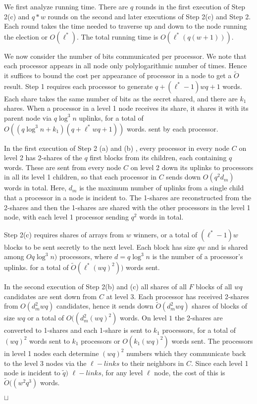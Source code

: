\documentclass[letterpaper,11pt]{article}
\newcommand{\sq}{\hbox{\rlap{$\sqcap$}$\sqcup$}}
\newcommand{\qed}{\hspace*{\fill}\sq}
\newenvironment{proof}{\noindent {\bf Proof:}}{\qed\par\vskip 4mm\par}
\begin{document}
\begin{proof}
We first analyze running time. There are  $q$ rounds in the first execution of  Step 2(c)  and $q*w$ rounds on the second and later executions of
Step 2(c) and Step 2.  Each round takes the time needed to traverse up and down to the node running the election or $O(\ell^*)$. 
The total running time is $O(\ell^*(q(w+1) ))$.

We now consider the number of bits communicated per processor. We note that each processor appears in all node only polylogarithmic number of times. Hence it suffices to bound the cost per appearance of processor in a node to get  a $\tilde{O}$ result. 
Step 1 requires each processor to  generate  $q + (\ell^*-1)wq +1$ words. Each share takes the same number of bits as the secret shared,  and there are
$k_1$ shares. When a processor in a level 1 node receives its share,  it  shares it with its parent node via $q \log^3 n$ uplinks, for a total of ${O}((q  \log^3 n + k_1)(q + \ell^*wq + 1))$ words.  sent by each processor. 

In the first execution of Step 2 (a) and (b) , every processor in every node $C$ on level 2 has  2-shares of the $q$ first blocks from its children, each containing $q$ words. These are  sent from every node $C$ on level 2 down its uplinks
to processors in all its  level 1 children,  so that each processor in  $C$ sends down $ {O}(q^2 d_m)$ words in total. Here, $d_m $ is the maximum number of uplinks from a single child that a processor in a node is incident to. The 1-shares are reconstructed from the 2-shares and then the 1-shares are shared with the other processors in the level 1 node, with each level 1 processor sending $q^2$ words in total. 

 Step 2(c) requires  shares of arrays from $w$ winners, or a total of $(\ell^*-1)w$ blocks to be sent secretly to the next level.  Each block has size $qw$ and is shared among ${O}q \log^3 n)$ processors, where $d=q \log^3 n$ is the number of a processor's uplinks. 
 for a total of $\tilde{O}(\ell^* (wq)^2 ))$ words sent. 
 
In the second execution of Step 2(b) and (c) all shares of all $F$ blocks of all $wq$ candidates are sent down from $C$ at level 3.  Each processor has received 
2-shares from  ${O}(d^2_m wq)$ candidates, hence it sends down $\tilde{O}(d^2_m wq)$ shares of blocks of size $wq$ or  a total of ${O}((d^2_m (wq)^2)$
words.
On level $1$ the 2-shares are converted to 1-shares and each 1-share is sent to $k_1$ processors, for a total of $(wq)^2$ words sent to $k_1$ processors or
$O(k_1 (wq)^2)$ words sent. 
The processors in level 1 nodes each determine $(wq)^2$ numbers which they communicate back to the level 3 nodes via the $\ell-links$ to their neighbors in $C$.
Since each level 1 node is incident to  $\tilde{q })$ $\ell-links$, for any level $\ell$ node, the cost of this is $\tilde{O}( (w^2 q^3)$ words.



\end{proof}
\end{document}
